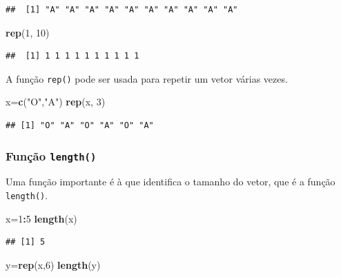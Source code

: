 \documentclass[
]{book}
\newenvironment{Shaded}{\begin{snugshade}}{\end{snugshade}}
\newcommand{\DecValTok}[1]{\textcolor[rgb]{0.00,0.00,0.81}{#1}}
\newcommand{\KeywordTok}[1]{\textcolor[rgb]{0.13,0.29,0.53}{\textbf{#1}}}
\newcommand{\NormalTok}[1]{#1}
\newcommand{\OperatorTok}[1]{\textcolor[rgb]{0.81,0.36,0.00}{\textbf{#1}}}
\newcommand{\StringTok}[1]{\textcolor[rgb]{0.31,0.60,0.02}{#1}}
\theoremstyle{definition}
\theoremstyle{definition}
\theoremstyle{definition}
\theoremstyle{remark}
\begin{document}
\begin{verbatim}
##  [1] "A" "A" "A" "A" "A" "A" "A" "A" "A" "A"
\end{verbatim}

\begin{Shaded}
\begin{Highlighting}[]
\KeywordTok{rep}\NormalTok{(}\DecValTok{1}\NormalTok{, }\DecValTok{10}\NormalTok{)}
\end{Highlighting}
\end{Shaded}

\begin{verbatim}
##  [1] 1 1 1 1 1 1 1 1 1 1
\end{verbatim}

A função \texttt{rep()} pode ser usada para repetir um vetor várias vezes.

\begin{Shaded}
\begin{Highlighting}[]
\NormalTok{x=}\KeywordTok{c}\NormalTok{(}\StringTok{"O"}\NormalTok{,}\StringTok{"A"}\NormalTok{)}
\KeywordTok{rep}\NormalTok{(x, }\DecValTok{3}\NormalTok{)}
\end{Highlighting}
\end{Shaded}

\begin{verbatim}
## [1] "O" "A" "O" "A" "O" "A"
\end{verbatim}

\hypertarget{funuxe7uxe3o-length}{%
\subsubsection{\texorpdfstring{Função \texttt{length()}}{Função length()}}\label{funuxe7uxe3o-length}}

Uma função importante é à que identifica o tamanho do vetor, que é a função \texttt{length()}.

\begin{Shaded}
\begin{Highlighting}[]
\NormalTok{x=}\DecValTok{1}\OperatorTok{:}\DecValTok{5}
\KeywordTok{length}\NormalTok{(x)}
\end{Highlighting}
\end{Shaded}

\begin{verbatim}
## [1] 5
\end{verbatim}

\begin{Shaded}
\begin{Highlighting}[]
\NormalTok{y=}\KeywordTok{rep}\NormalTok{(x,}\DecValTok{6}\NormalTok{)}
\KeywordTok{length}\NormalTok{(y)}
\end{Highlighting}
\end{Shaded}
\end{document}
